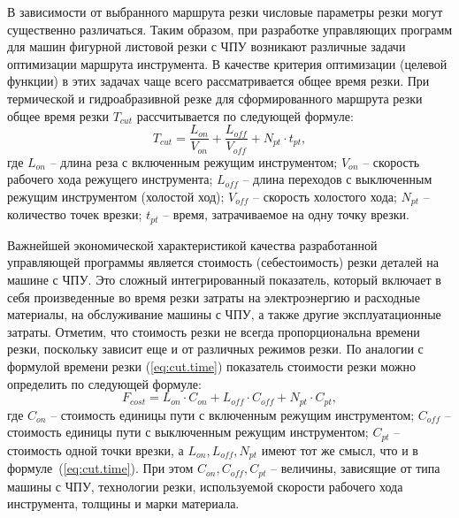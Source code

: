В зависимости от выбранного маршрута резки
числовые параметры резки могут существенно различаться.
Таким образом, при разработке управляющих программ
для машин фигурной листовой резки с ЧПУ возникают
различные задачи оптимизации маршрута инструмента.
В качестве критерия оптимизации (целевой функции)
в этих задачах чаще всего рассматривается общее время резки.
При термической и гидроабразивной резке для сформированного
маршрута резки общее время резки
$T_{cut}$
рассчитывается по следующей формуле:
\begin{equation}
  T_{cut} = \frac{L_{on}}{V_{on}} + \frac{L_{off}}{V_{off}} +N_{pt} \cdot t_{pt}
  ,
  \label{eq:cut.time}
\end{equation}
где
$L_{on}$ -- длина реза с включенным режущим инструментом;
$V_{on}$ -- скорость рабочего хода режущего инструмента;
$L_{off}$ -- длина переходов с выключенным режущим инструментом (холостой ход);
$V_{off}$ -- скорость холостого хода;
$N_{pt}$ -- количество точек врезки;
$t_{pt}$ -- время, затрачиваемое на одну точку врезки.

Важнейшей экономической характеристикой качества
разработанной управляющей программы является стоимость
(себестоимость) резки деталей на машине с ЧПУ.
Это сложный интегрированный показатель,
который включает в себя произведенные во время
резки затраты на электроэнергию и расходные материалы,
на обслуживание машины с ЧПУ,
а также другие эксплуатационные затраты.
Отметим, что стоимость резки не всегда
пропорциональна времени резки,
поскольку зависит еще и от различных режимов резки.
По аналогии с формулой времени резки (\ref{eq:cut.time})
показатель стоимости резки можно определить по следующей формуле:
\begin{equation}
  F_{cost}=
  L_{on} \cdot C_{on} +
  L_{off} \cdot C_{off} +
  N_{pt} \cdot C_{pt}
  ,
  \label{eq:cut.cost}
\end{equation}
где
$C_{on}$ -- стоимость единицы пути с включенным режущим инструментом;
$C_{off}$ -- стоимость единицы пути с выключенным режущим инструментом;
$C_{pt}$ -- стоимость одной точки врезки,
а $L_{on}, L_{off}, N_{pt}$
имеют тот же смысл, что и в формуле~(\ref{eq:cut.time}).
При этом $C_{on}, C_{off}, C_{pt}$ --
величины, зависящие от типа машины с ЧПУ,
технологии резки, используемой скорости рабочего хода инструмента,
толщины и марки материала.
